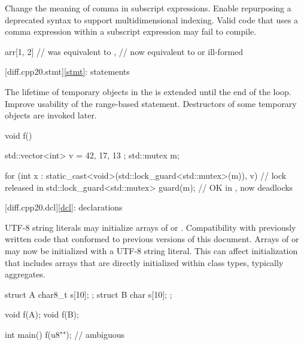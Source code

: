 \change
Change the meaning of comma in subscript expressions.
\rationale
Enable repurposing a deprecated syntax to support multidimensional indexing.
\effect
Valid \CppXX{} code that uses a comma expression within a
subscript expression may fail to compile.
\begin{example}
\begin{codeblock}
arr[1, 2]               // was equivalent to ,
                        // now equivalent to  or ill-formed
\end{codeblock}
\end{example}

[diff.cpp20.stmt]{\ref*{stmt}: statements}

\change
The lifetime of temporary objects in the 
is extended until the end of the loop.
\rationale
Improve usability of the range-based  statement.
\effect
Destructors of some temporary objects are invoked later.
\begin{example}
\begin{codeblock}
void f() {
  std::vector<int> v = { 42, 17, 13 };
  std::mutex m;

  for (int x :
       static_cast<void>(std::lock_guard<std::mutex>(m)), v) {  // lock released in \CppXX
    std::lock_guard<std::mutex> guard(m);                       // OK in \CppXX, now deadlocks
  }
}
\end{codeblock}
\end{example}

[diff.cpp20.dcl]{\ref*{dcl}: declarations}

\change
UTF-8 string literals may initialize arrays of  or
.
\rationale
Compatibility with previously written code that conformed to previous versions of this document.
\effect
Arrays of  or 
may now be initialized with a UTF-8 string literal.
This can affect initialization that includes arrays
that are directly initialized within class types, typically aggregates.
\begin{example}
\begin{codeblock}
struct A {
  char8_t s[10];
};
struct B {
  char s[10];
};

void f(A);
void f(B);

int main() {
  f({u8""});            // ambiguous
}
\end{codeblock}
\end{example}

